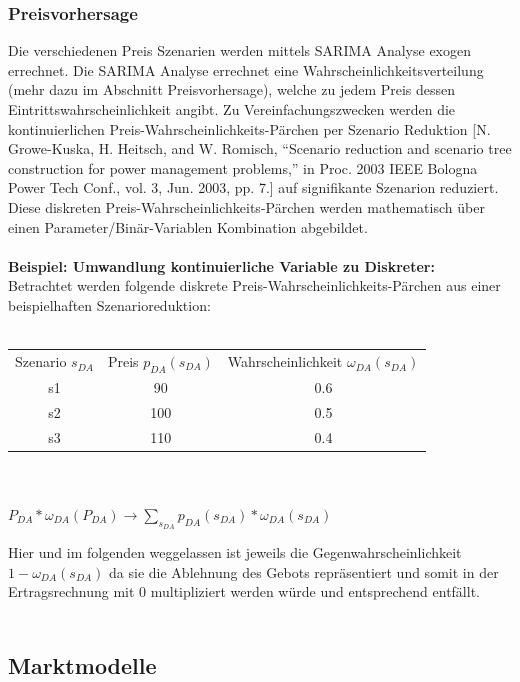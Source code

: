 \documentclass{article}
\begin{document}
\subsubsection{Preisvorhersage}
Die verschiedenen Preis Szenarien werden mittels SARIMA Analyse exogen errechnet. Die SARIMA Analyse errechnet eine Wahrscheinlichkeitsverteilung (mehr dazu im Abschnitt Preisvorhersage), welche zu jedem Preis dessen Eintrittswahrscheinlichkeit angibt. Zu Vereinfachungszwecken werden die kontinuierlichen Preis-Wahrscheinlichkeits-Pärchen per Szenario Reduktion [N. Growe-Kuska, H. Heitsch, and W. Romisch, “Scenario reduction and scenario tree construction for power management problems,” in Proc.
2003 IEEE Bologna Power Tech Conf., vol. 3, Jun. 2003, pp. 7.] auf signifikante Szenarion reduziert.
Diese diskreten Preis-Wahrscheinlichkeits-Pärchen werden mathematisch über einen Parameter/Binär-Variablen Kombination abgebildet.\\
\\
\textbf{Beispiel: Umwandlung kontinuierliche Variable zu Diskreter:}
\\
Betrachtet werden folgende diskrete Preis-Wahrscheinlichkeits-Pärchen aus einer beispielhaften Szenarioreduktion:\\
\\
\begin{tabular}{c|c|c}
     Szenario $s_{DA}$& Preis $p_{DA}(s_{DA})$ & Wahrscheinlichkeit $\omega_{DA}(s_{DA})$ \\
     s1       & 90 & 0.6 \\
     s2       & 100 & 0.5 \\
     s3       & 110 & 0.4 \\
\end{tabular}\\
\\

$P_{DA} * \omega_{DA}(P_{DA}) \rightarrow \sum_{s_{DA}} p_{DA}(s_{DA}) * \omega_{DA}(s_{DA})$\\


 Hier und im folgenden weggelassen ist jeweils die Gegenwahrscheinlichkeit $1-\omega_{DA}(s_{DA})$ da sie die Ablehnung des Gebots repräsentiert und somit in der Ertragsrechnung mit 0 multipliziert werden würde und entsprechend entfällt.\\
\\

\subsection{Marktmodelle}
\end{document}
